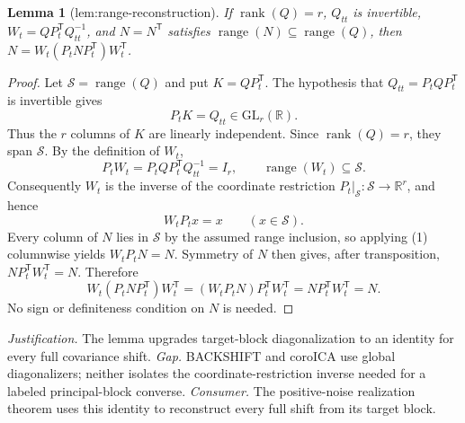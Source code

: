\documentclass{article}
\newtheorem{lemma}{Lemma}
\begin{document}
\begin{lemma}[lem:range-reconstruction]\label{lem:range-reconstruction}
If \(\operatorname{rank}(Q)=r\), \(Q_{tt}\) is invertible, \(W_t=QP_t^{\mathsf T}Q_{tt}^{-1}\), and \(N=N^{\mathsf T}\) satisfies \(\operatorname{range}(N)\subseteq\operatorname{range}(Q)\), then \(N=W_t(P_tNP_t^{\mathsf T})W_t^{\mathsf T}\).
\end{lemma}
\begin{proof}
Let \(\mathcal S=\operatorname{range}(Q)\) and put \(K=QP_t^{\mathsf T}\).  The hypothesis that \(Q_{tt}=P_tQP_t^{\mathsf T}\) is invertible gives
\[
 P_tK=Q_{tt}\in\mathrm{GL}_r(\mathbb R).
\]
Thus the \(r\) columns of \(K\) are linearly independent.  Since \(\operatorname{rank}(Q)=r\), they span \(\mathcal S\).  By the definition of \(W_t\),
\[
 P_tW_t=P_tQP_t^{\mathsf T}Q_{tt}^{-1}=I_r,
 \qquad \operatorname{range}(W_t)\subseteq\mathcal S.
\]
Consequently \(W_t\) is the inverse of the coordinate restriction \(P_t\vert_{\mathcal S}:\mathcal S\to\mathbb R^r\), and hence
\[
 W_tP_tx=x\qquad(x\in\mathcal S). \tag{1}
\]
Every column of \(N\) lies in \(\mathcal S\) by the assumed range inclusion, so applying (1) columnwise yields \(W_tP_tN=N\).  Symmetry of \(N\) then gives, after transposition, \(NP_t^{\mathsf T}W_t^{\mathsf T}=N\).  Therefore
\[
 W_t(P_tNP_t^{\mathsf T})W_t^{\mathsf T}
 =(W_tP_tN)P_t^{\mathsf T}W_t^{\mathsf T}
 =NP_t^{\mathsf T}W_t^{\mathsf T}=N.
\]
No sign or definiteness condition on \(N\) is needed.
\end{proof}
\par\smallskip\noindent \textit{Justification.} The lemma upgrades target-block diagonalization to an identity for every full covariance shift. \textit{Gap.} BACKSHIFT and coroICA use global diagonalizers; neither isolates the coordinate-restriction inverse needed for a labeled principal-block converse. \textit{Consumer.} The positive-noise realization theorem uses this identity to reconstruct every full shift from its target block.
\end{document}
